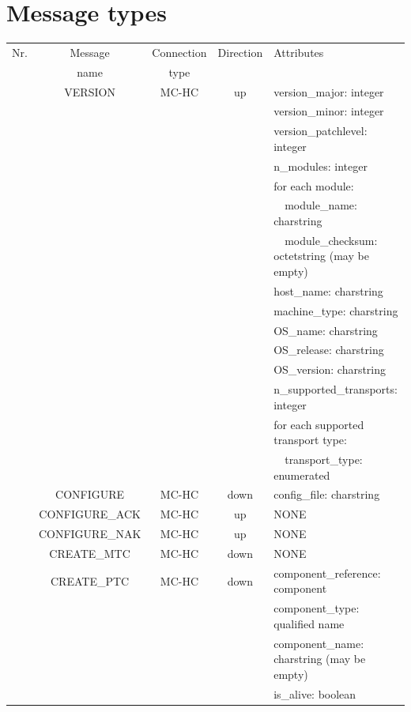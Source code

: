 \documentclass[a4paper,10pt]{article}
\begin{document}
\newpage

\section{Message types}

\newcommand{\msgnr}{\addtocounter{msgcounter}{1}\arabic{msgcounter}}

\begin{longtable}{|c|c|c|c|p{4.85cm}|}
\hline
Nr. & Message & Connection & Direction & Attributes \\
 & name & type &  & \\
\hline
\endhead
\endfoot
\msgnr & VERSION & MC-HC & up & version\_major: integer \\
 & & & & version\_minor: integer \\
 & & & & version\_patchlevel: integer \\
 & & & & n\_modules: integer \\
 & & & & for each module: \\
 & & & & ~~module\_name: charstring \\
 & & & & ~~module\_checksum: octetstring (may be empty) \\
 & & & & host\_name: charstring \\
 & & & & machine\_type: charstring \\
 & & & & OS\_name: charstring \\
 & & & & OS\_release: charstring \\
 & & & & OS\_version: charstring \\
 & & & & n\_supported\_transports: integer \\
 & & & & for each supported transport type: \\
 & & & & ~~transport\_type: enumerated \\
\hline
\msgnr & CONFIGURE & MC-HC & down & config\_file: charstring \\
\hline
\msgnr & CONFIGURE\_ACK & MC-HC & up & NONE \\
\hline
\msgnr & CONFIGURE\_NAK & MC-HC & up & NONE \\
\hline
\msgnr & CREATE\_MTC & MC-HC & down & NONE \\
\hline
\msgnr & CREATE\_PTC & MC-HC & down & component\_reference: component \\
 & & & & component\_type: qualified name \\
 & & & & component\_name: charstring (may be empty) \\
 & & & & is\_alive: boolean \\

\end{longtable}
\end{document}
